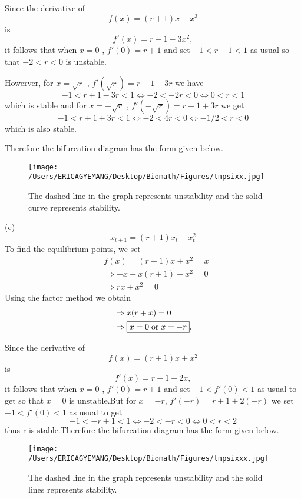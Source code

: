 \documentclass[12pt]{article}
\begin{document}
\begin{enumerate}
Since the derivative of 
\[f(x)=(r+1)x-x^3\]
is
\[\boxed{f'(x)=r+1-3x^2},\]
it follows that when $x=0$ , $f'(0)=r+1$ and set $-1<r+1<1$ as usual so that $-2<r<0$ is unstable.

Howerver, for $x=\sqrt{r}$ , $f'(\sqrt{r})=r+1-3r$ we have
\[-1<r+1-3r<1 \Leftrightarrow -2<-2r<0 \Leftrightarrow \boxed{ 0<r<1}\] which is stable
and for $x=-\sqrt{r}$ , $f'(-\sqrt{r})=r+1+3r$ we get
\[-1<r+1+3r<1 \Leftrightarrow -2<4r<0 \Leftrightarrow \boxed{ -1/2<r<0}\] which is also stable.

Therefore the bifurcation diagram has the form given below.

\begin{figure} [ht!]
 \centering
 \texttt{[image: /Users/ERICAGYEMANG/Desktop/Biomath/Figures/tmpsixx.jpg]} 
        \caption[Figure 2.4: r>1]{The dashed line in the graph represents unstability and the solid curve represents stability.}
 \label{fig::model}
\end{figure}

\cleardoublepage
(c) \[x_{t+1}=(r+1)x_t+x_t^2\] 
To find the equilibrium points, we set 
\begin{align*}
&f(x)=(r+1)x+x^2=x\\
&\Rightarrow -x+x(r+1)+x^2=0\\
&\Rightarrow rx+x^2=0
\end{align*}
Using the factor method we obtain
\begin{align*}
&\Rightarrow x(r+x)=0\\
&\Rightarrow \boxed{x=0\hspace{0.1cm} \mbox{or} \hspace{0.1cm} x=-r}.
\end{align*}

Since the derivative of 
\[f(x)=(r+1)x+x^2\]
is
\[\boxed{f'(x)=r+1+2x},\]
it follows that when $x=0$ , $f'(0)=r+1$ and set $-1<f'(0)<1$ as usual to get  so that $x=0$ is unstable.But for $x=-r$, $f'(-r)=r+1+2(-r)$ we set $-1<f'(0)<1$ as usual to get
\[-1<-r+1<1\Leftrightarrow -2<-r<0 \Leftrightarrow \boxed{0<r<2}\]
thus r is stable.Therefore the bifurcation diagram has the form given below.

\begin{figure} [ht!]
 \centering
 \texttt{[image: /Users/ERICAGYEMANG/Desktop/Biomath/Figures/tmpsixxx.jpg]} 
        \caption[Figure 2.4: r>1]{The dashed line in the graph represents unstability and the solid lines represents stability.}
 \label{fig::model}
\end{figure}


\end{enumerate}
\end{document}
